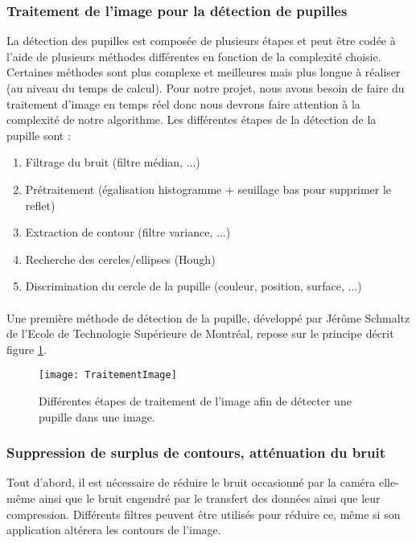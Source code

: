 \subsubsection{Traitement de l’image pour la détection de pupilles}

La détection des pupilles est composée de plusieurs étapes et peut être codée à l’aide de plusieurs méthodes différentes en fonction de la complexité choisie. Certaines méthodes sont plus complexe et meilleures mais plus longue à réaliser (au niveau du temps de calcul). Pour notre projet, nous avons besoin de faire du traitement d’image en temps réel donc nous devrons faire attention à la complexité de notre algorithme. Les différentes étapes de la détection de la pupille sont : 
\begin{enumerate}
\item Filtrage du bruit (filtre médian, ...) 
\item Prétraitement (égalisation histogramme + seuillage bas pour supprimer le reflet) 
\item Extraction de contour (filtre variance, ...) 
\item Recherche des cercles/ellipses (Hough)
\item Discrimination du cercle de la pupille (couleur, position, surface, ...) 
\end{enumerate}
\paragraph{}
Une première méthode de détection de la pupille, développé par Jérôme Schmaltz de l’Ecole de Technologie Supérieure de Montréal, repose sur le principe décrit figure \ref{fig:TraitementImage}.
\begin{figure}[h]
  \centering
  \texttt{[image: TraitementImage]}
  \caption{Différentes étapes de traitement de l’image afin de détecter une pupille dans une image.}
  \label{fig:TraitementImage}
\end{figure}

\subsubsection*{Suppression de surplus de contours, atténuation du bruit}
\label{Filtre}

Tout d’abord, il est nécessaire de réduire le bruit occasionné par la caméra elle-même ainsi que le bruit engendré par le transfert des données ainsi que leur compression. Différents filtres peuvent être utilisés pour réduire ce, même si son application altérera les contours de l’image. 

